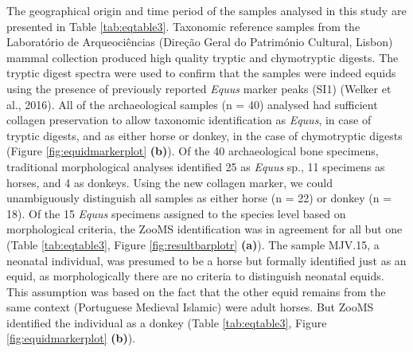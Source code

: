 \documentclass[preprint, 3p, authoryear]{elsarticle} %
\begin{document}
The geographical origin and time period of the samples analysed in this study are presented in Table \ref{tab:eqtable3}.
Taxonomic reference samples from the Laboratório de Arqueociências (Direção Geral do Património Cultural, Lisbon) mammal collection produced high quality tryptic and chymotryptic digests. The tryptic digest spectra were used to confirm that the samples were indeed equids using the presence of previously reported \emph{Equus} marker peaks (SI1) (Welker et al., 2016). All of the archaeological samples (n = 40) analysed had sufficient collagen preservation to allow taxonomic identification as \emph{Equus}, in case of tryptic digests, and as either horse or donkey, in the case of chymotryptic digests (Figure \ref{fig:equidmarkerplot} \textbf{(b)}). Of the 40 archaeological bone specimens, traditional morphological analyses identified 25 as \emph{Equus} sp., 11 specimens as horses, and 4 as donkeys. Using the new collagen marker, we could unambiguously distinguish all samples as either horse (n = 22) or donkey (n = 18). Of the 15 \emph{Equus} specimens assigned to the species level based on morphological criteria, the ZooMS identification was in agreement for all but one (Table \ref{tab:eqtable3}, Figure \ref{fig:resultbarplotr} \textbf{(a)}). The sample MJV.15, a neonatal individual, was presumed to be a horse but formally identified just as an equid, as morphologically there are no criteria to distinguish neonatal equids. This assumption was based on the fact that the other equid remains from the same context (Portuguese Medieval Islamic) were adult horses. But ZooMS identified the individual as a donkey (Table \ref{tab:eqtable3}, Figure \ref{fig:equidmarkerplot} \textbf{(b)}).
\end{document}
